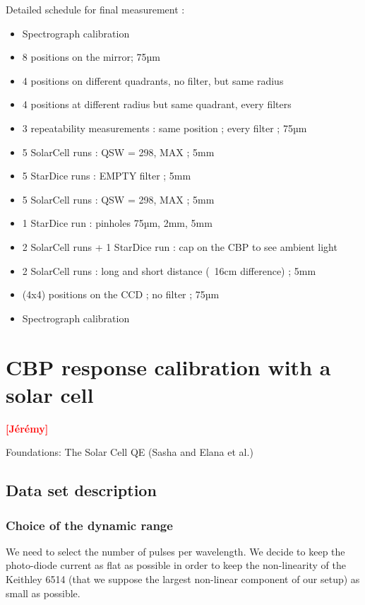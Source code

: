 \documentclass[onecolumn]{aa}
\newcommand{\todo}[1]{\textbf{\textcolor{red}{[#1]}}\xspace}
\begin{document}
Detailed schedule for final measurement :
\begin{itemize}
    \item Spectrograph calibration
    \item 8 positions on the mirror; 75µm
    \item 4 positions on different quadrants, no filter, but same radius 
    \item 4 positions at different radius but same quadrant, every filters
    \item 3 repeatability measurements : same position ; every filter ; 75µm
    \item 5 SolarCell runs : QSW = 298, MAX ; 5mm
    \item 5 StarDice runs : EMPTY filter ; 5mm
    \item 5 SolarCell runs : QSW = 298, MAX ; 5mm
    \item 1 StarDice run : pinholes 75µm, 2mm, 5mm
    \item 2 SolarCell runs + 1 StarDice run : cap on the CBP to see ambient light
    \item 2 SolarCell runs : long and short distance (~16cm difference) ; 5mm
    \item (4x4) positions on the CCD ; no filter ; 75µm
    \item Spectrograph calibration
\end{itemize}








\section{CBP response calibration with a solar cell}
\label{sec:rcbp}

\todo{Jérémy}

Foundations: The Solar Cell QE (Sasha and Elana et al.)


\subsection{Data set description}


\subsubsection{Choice of the dynamic range}
We need to select the number of pulses per wavelength. We decide to keep the
photo-diode current as flat as possible in order to keep the non-linearity of
the Keithley 6514 (that we suppose the largest non-linear component of our
setup) as small as possible.
\end{document}
